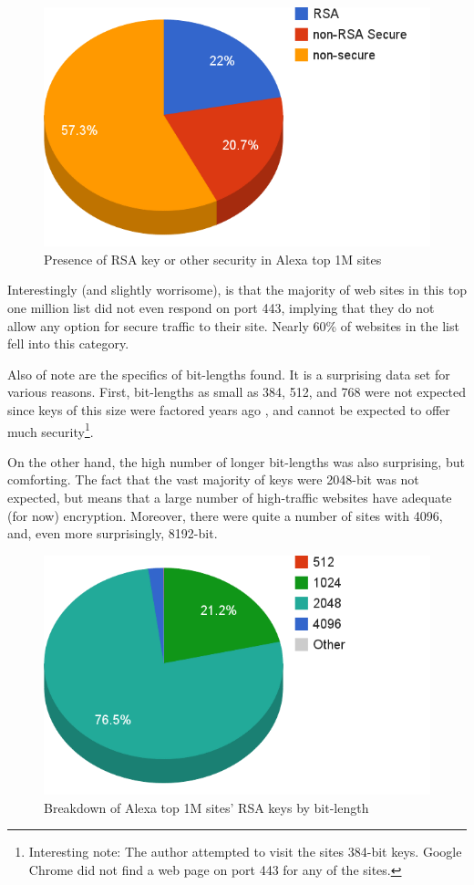 \documentclass[12pt]{ucthesis}
\begin{document}
\begin{figure}
   \centering
   \includegraphics[width=0.75\linewidth]{cert_security}
   \caption{Presence of RSA key or other security in Alexa top 1M sites}
   \label{fig:certs}
\end{figure}

Interestingly (and slightly worrisome), is that the majority of web sites in
this top one million list did not even respond on port 443, implying that
they do not allow any option for secure traffic to their site. Nearly 60\% of
websites in the list fell into this category.

Also of note are the specifics of bit-lengths found. It is a surprising data
set for various reasons. First, bit-lengths as small as 384, 512, and 768 were
not expected since keys of this size were factored years ago
\citep{rsa2007challenge}, and cannot be expected to offer much
security\footnote{Interesting note: The author attempted to visit the sites
384-bit keys. Google Chrome did not find a web page on port 443 for any of
the sites.}.

On the other hand, the high number of longer bit-lengths was also surprising,
but comforting. The fact that the vast majority of keys were 2048-bit was not
expected, but means that a large number of high-traffic websites have adequate
(for now) encryption. Moreover, there were quite a number of sites with 4096,
and, even more surprisingly, 8192-bit.

\begin{figure}
   \centering
   \includegraphics[width=0.75\linewidth]{bit_length}
   \caption{Breakdown of Alexa top 1M sites' RSA keys by bit-length}
   \label{fig:bits}
\end{figure}
\end{document}
